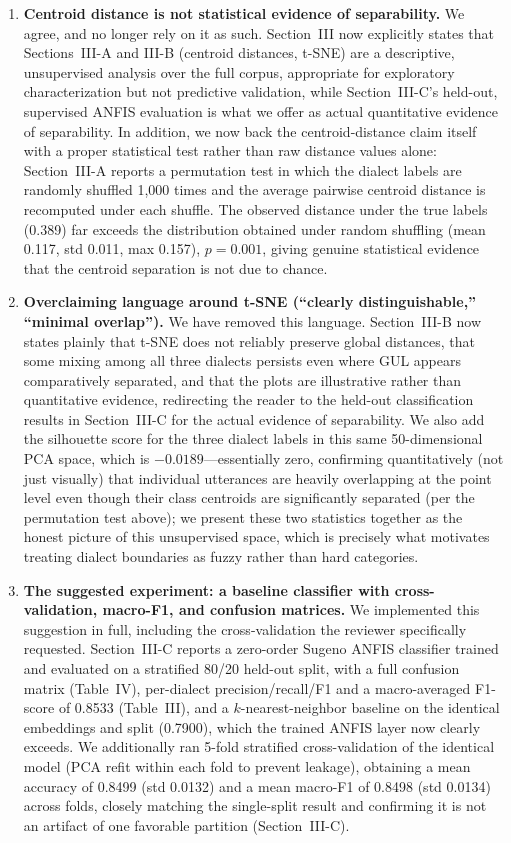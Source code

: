 \documentclass[11pt]{article}
\begin{document}
\begin{enumerate}
\item \textbf{Centroid distance is not statistical evidence of separability.} We agree, and no longer rely on it as such. Section~III now explicitly states that Sections~III-A and III-B (centroid distances, t-SNE) are a descriptive, unsupervised analysis over the full corpus, appropriate for exploratory characterization but not predictive validation, while Section~III-C's held-out, supervised ANFIS evaluation is what we offer as actual quantitative evidence of separability. In addition, we now back the centroid-distance claim itself with a proper statistical test rather than raw distance values alone: Section~III-A reports a permutation test in which the dialect labels are randomly shuffled 1,000 times and the average pairwise centroid distance is recomputed under each shuffle. The observed distance under the true labels (0.389) far exceeds the distribution obtained under random shuffling (mean 0.117, std 0.011, max 0.157), $p=0.001$, giving genuine statistical evidence that the centroid separation is not due to chance.

\item \textbf{Overclaiming language around t-SNE (``clearly distinguishable,'' ``minimal overlap'').} We have removed this language. Section~III-B now states plainly that t-SNE does not reliably preserve global distances, that some mixing among all three dialects persists even where GUL appears comparatively separated, and that the plots are illustrative rather than quantitative evidence, redirecting the reader to the held-out classification results in Section~III-C for the actual evidence of separability. We also add the silhouette score for the three dialect labels in this same 50-dimensional PCA space, which is $-0.0189$---essentially zero, confirming quantitatively (not just visually) that individual utterances are heavily overlapping at the point level even though their class centroids are significantly separated (per the permutation test above); we present these two statistics together as the honest picture of this unsupervised space, which is precisely what motivates treating dialect boundaries as fuzzy rather than hard categories.

\item \textbf{The suggested experiment: a baseline classifier with cross-validation, macro-F1, and confusion matrices.} We implemented this suggestion in full, including the cross-validation the reviewer specifically requested. Section~III-C reports a zero-order Sugeno ANFIS classifier trained and evaluated on a stratified 80/20 held-out split, with a full confusion matrix (Table~IV), per-dialect precision/recall/F1 and a macro-averaged F1-score of 0.8533 (Table~III), and a $k$-nearest-neighbor baseline on the identical embeddings and split (0.7900), which the trained ANFIS layer now clearly exceeds. We additionally ran 5-fold stratified cross-validation of the identical model (PCA refit within each fold to prevent leakage), obtaining a mean accuracy of 0.8499 (std 0.0132) and a mean macro-F1 of 0.8498 (std 0.0134) across folds, closely matching the single-split result and confirming it is not an artifact of one favorable partition (Section~III-C).


\end{enumerate}
\end{document}
